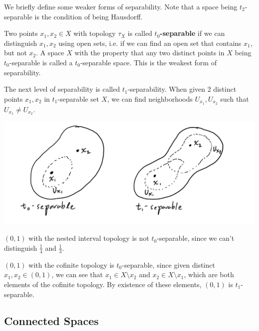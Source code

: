 \documentclass{article}
\begin{document}
    We briefly define some weaker forms of separability. Note that a space being $t_2$-separable is the condition of being Hausdorff. 

    \begin{definition}[$t_0, t_1$-Separability]
    Two points $x_1, x_2 \in X$ with topology $\tau_{X}$ is called $t_0$\textbf{-separable} if we can distinguish $x_1, x_2$ using open sets, i.e. if we can find an open set that contains $x_1$, but not $x_2$. A space $X$ with the property that any two distinct points in $X$ being $t_0$-separable is called a $t_0$-separable space. This is the weakest form of separability. 

    The next level of separability is called $t_1$-separability. When given 2 distinct points $x_1, x_2$ in $t_1$-separable set $X$, we can find neighborhoods $U_{x_1}, U_{x_2}$ such that $U_{x_1} \neq U_{x_2}$. 
    \begin{center}
        \includegraphics[scale=0.25]{img/t0_t1_Separability.PNG}
    \end{center}
    \end{definition}

    \begin{example}
    $(0,1)$ with the nested interval topology is not $t_0$-separable, since we can't distinguish $\frac{1}{4}$ and $\frac{1}{3}$.
    \end{example}

    \begin{example}
    $(0,1)$ with the cofinite topology is $t_0$-separable, since given distinct $x_1, x_2 \in (0,1)$, we can see that $x_1 \in X \setminus {x_2}$ and $x_2 \in X \setminus {x_1}$, which are both elements of the cofinite topology. By existence of these elements, $(0,1)$ is $t_1$-separable. 
    \end{example}

  \subsection{Connected Spaces}
\end{document}
